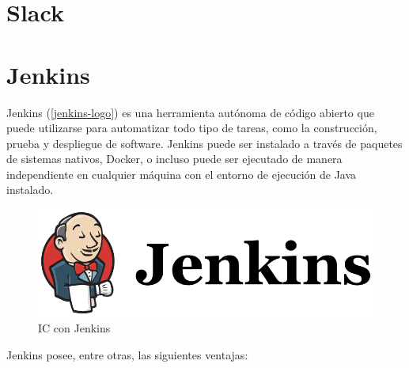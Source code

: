 \section{Slack}



\section{Jenkins}

Jenkins (\autoref{jenkins-logo}) es una herramienta autónoma de código abierto que puede utilizarse para automatizar todo tipo de tareas, como la construcción, prueba y despliegue de software. Jenkins puede ser instalado a través de paquetes de sistemas nativos, Docker, o incluso puede ser ejecutado de manera independiente en cualquier máquina con el entorno de ejecución de Java instalado\cite{jenkins2017}.


\begin{figure}[htbp]
	\centering
	\includegraphics[width=0.80\linewidth]
	{entorno/figuras/jenkins.png}
	\caption{\gls{IC} con Jenkins}
	\label{jenkins-logo}
\end{figure}


Jenkins posee, entre otras, las siguientes ventajas:

